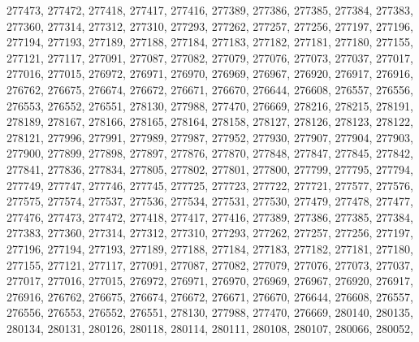 \begin{appendix}
\begin{itemize}
     277473, 277472, 277418, 277417, 277416, 277389, 277386, 277385, 277384, 277383,\\
     277360, 277314, 277312, 277310, 277293, 277262, 277257, 277256, 277197, 277196,\\
     277194, 277193, 277189, 277188, 277184, 277183, 277182, 277181, 277180, 277155,\\
     277121, 277117, 277091, 277087, 277082, 277079, 277076, 277073, 277037, 277017,\\
     277016, 277015, 276972, 276971, 276970, 276969, 276967, 276920, 276917, 276916,\\
     276762, 276675, 276674, 276672, 276671, 276670, 276644, 276608, 276557, 276556,\\
     276553, 276552, 276551, 278130, 277988, 277470, 276669, 278216, 278215, 278191,\\
     278189, 278167, 278166, 278165, 278164, 278158, 278127, 278126, 278123, 278122,\\
     278121, 277996, 277991, 277989, 277987, 277952, 277930, 277907, 277904, 277903,\\
     277900, 277899, 277898, 277897, 277876, 277870, 277848, 277847, 277845, 277842,\\
     277841, 277836, 277834, 277805, 277802, 277801, 277800, 277799, 277795, 277794,\\
     277749, 277747, 277746, 277745, 277725, 277723, 277722, 277721, 277577, 277576,\\
     277575, 277574, 277537, 277536, 277534, 277531, 277530, 277479, 277478, 277477,\\
     277476, 277473, 277472, 277418, 277417, 277416, 277389, 277386, 277385, 277384,\\
     277383, 277360, 277314, 277312, 277310, 277293, 277262, 277257, 277256, 277197,\\
     277196, 277194, 277193, 277189, 277188, 277184, 277183, 277182, 277181, 277180,\\
     277155, 277121, 277117, 277091, 277087, 277082, 277079, 277076, 277073, 277037,\\
     277017, 277016, 277015, 276972, 276971, 276970, 276969, 276967, 276920, 276917,\\
     276916, 276762, 276675, 276674, 276672, 276671, 276670, 276644, 276608, 276557,\\
     276556, 276553, 276552, 276551, 278130, 277988, 277470, 276669, 280140, 280135,\\
     280134, 280131, 280126, 280118, 280114, 280111, 280108, 280107, 280066, 280052,\\

\end{itemize}
\end{appendix}
